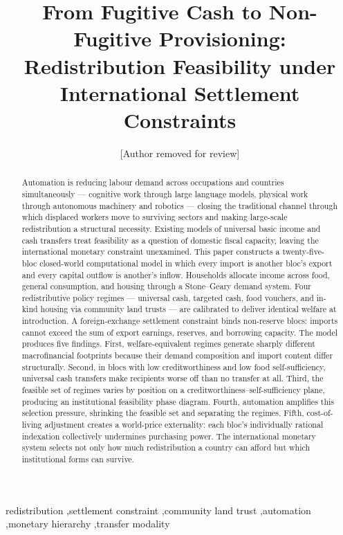 \documentclass[preprint,review,12pt]{elsarticle}
\begin{document}
\begin{frontmatter}

\title{From Fugitive Cash to Non-Fugitive Provisioning:\\
Redistribution Feasibility under International Settlement Constraints}

\author[anon]{[Author removed for review]}

\begin{abstract}
Automation is reducing labour demand across occupations and countries simultaneously --- cognitive work through large language models, physical work through autonomous machinery and robotics --- closing the traditional channel through which displaced workers move to surviving sectors and making large-scale redistribution a structural necessity. Existing models of universal basic income and cash transfers treat feasibility as a question of domestic fiscal capacity, leaving the international monetary constraint unexamined. This paper constructs a twenty-five-bloc closed-world computational model in which every import is another bloc's export and every capital outflow is another's inflow. Households allocate income across food, general consumption, and housing through a Stone--Geary demand system. Four redistributive policy regimes --- universal cash, targeted cash, food vouchers, and in-kind housing via community land trusts --- are calibrated to deliver identical welfare at introduction. A foreign-exchange settlement constraint binds non-reserve blocs: imports cannot exceed the sum of export earnings, reserves, and borrowing capacity. The model produces five findings. First, welfare-equivalent regimes generate sharply different macrofinancial footprints because their demand composition and import content differ structurally. Second, in blocs with low creditworthiness and low food self-sufficiency, universal cash transfers make recipients worse off than no transfer at all. Third, the feasible set of regimes varies by position on a creditworthiness--self-sufficiency plane, producing an institutional feasibility phase diagram. Fourth, automation amplifies this selection pressure, shrinking the feasible set and separating the regimes. Fifth, cost-of-living adjustment creates a world-price externality: each bloc's individually rational indexation collectively undermines purchasing power. The international monetary system selects not only how much redistribution a country can afford but which institutional forms can survive.
\end{abstract}


\begin{keyword}
redistribution \sep settlement constraint \sep community land trust \sep automation \sep monetary hierarchy \sep transfer modality
\end{keyword}

\end{frontmatter}
\end{document}

